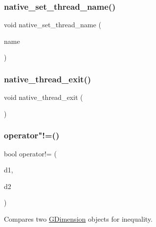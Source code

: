 \subsubsection{\texorpdfstring{native\+\_\+set\+\_\+thread\+\_\+name()}{native\_set\_thread\_name()}}
{\footnotesize\ttfamily void native\+\_\+set\+\_\+thread\+\_\+name (\begin{DoxyParamCaption}\item[{const char $\ast$}]{name }\end{DoxyParamCaption})}

\mbox{\label{namespacesgl_ae7608d4a4feb793224d080d1ef916ee9}} 
\subsubsection{\texorpdfstring{native\+\_\+thread\+\_\+exit()}{native\_thread\_exit()}}
{\footnotesize\ttfamily void native\+\_\+thread\+\_\+exit (\begin{DoxyParamCaption}{ }\end{DoxyParamCaption})}

\mbox{\label{namespacesgl_a38754b56ceecfaa7cbf3947a19c8ceb6}} 
\subsubsection{\texorpdfstring{operator"!=()}{operator!=()}\hspace{0.1cm}{\footnotesize\ttfamily [1/4]}}
{\footnotesize\ttfamily bool operator!= (\begin{DoxyParamCaption}\item[{const \mbox{\hyperlink{structsgl_1_1GDimension}{G\+Dimension}} \&}]{d1,  }\item[{const \mbox{\hyperlink{structsgl_1_1GDimension}{G\+Dimension}} \&}]{d2 }\end{DoxyParamCaption})}



Compares two \mbox{\hyperlink{structsgl_1_1GDimension}{G\+Dimension}} objects for inequality. 

\mbox{\label{namespacesgl_add41464e7e2d69b7a90c72b16a7dbc6c}} 
